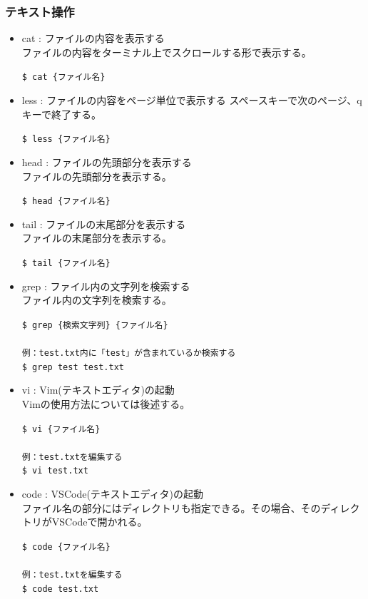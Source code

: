 \documentclass[a4paper, 11pt, dvipdfmx]{jsarticle}
\begin{document}
\subsubsection{テキスト操作}
\begin{itemize}
  \item cat : ファイルの内容を表示する\\
  ファイルの内容をターミナル上でスクロールする形で表示する。
  \begin{terminalbox}
    \verb|$ cat {ファイル名}|
  \end{terminalbox}
  \item less : ファイルの内容をページ単位で表示する
  スペースキーで次のページ、qキーで終了する。
  \begin{terminalbox}
    \verb|$ less {ファイル名}|
  \end{terminalbox}
  \item head : ファイルの先頭部分を表示する\\
  ファイルの先頭部分を表示する。
  \begin{terminalbox}
    \verb|$ head {ファイル名}|
  \end{terminalbox}
  \item tail : ファイルの末尾部分を表示する\\
  ファイルの末尾部分を表示する。
  \begin{terminalbox}
    \verb|$ tail {ファイル名}|
  \end{terminalbox}
  \item grep : ファイル内の文字列を検索する\\
  ファイル内の文字列を検索する。
  \begin{terminalbox}
    \verb|$ grep {検索文字列} {ファイル名}|\\\\
    \verb|例：test.txt内に「test」が含まれているか検索する|\\
    \verb|$ grep test test.txt|
  \end{terminalbox}
  \item vi : Vim(テキストエディタ)の起動\\
  Vimの使用方法については後述する。
  \begin{terminalbox}
    \verb|$ vi {ファイル名}|\\\\
    \verb|例：test.txtを編集する|\\
    \verb|$ vi test.txt|
  \end{terminalbox}
  \item code : VSCode(テキストエディタ)の起動\\
  ファイル名の部分にはディレクトリも指定できる。その場合、そのディレクトリがVSCodeで開かれる。
  \begin{terminalbox}
    \verb|$ code {ファイル名}|\\\\
    \verb|例：test.txtを編集する|\\
    \verb|$ code test.txt|
  \end{terminalbox}
\end{itemize}
\end{document}
